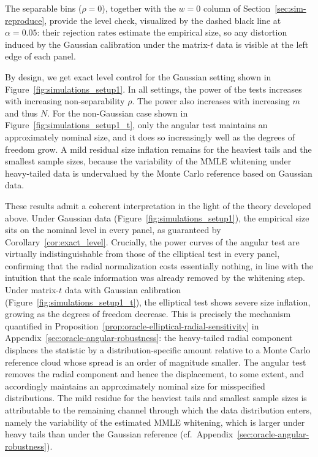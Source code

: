 \documentclass[12pt]{article}
\begin{document}
The separable bins ($\rho=0$), together with the $w=0$ column of Section~\ref{sec:sim-reproduce}, provide the level check, visualized by the dashed black line at $\alpha = 0.05$: their rejection rates estimate the empirical size, so any distortion induced by the Gaussian calibration under the matrix-$t$ data is visible at the left edge of each panel.

By design, we get exact level control for the Gaussian setting shown in Figure~\ref{fig:simulations_setup1}. In all settings, the power of the tests increases with increasing non-separability $\rho$. 
The power also increases with increasing $m$ and thus $N$. For the non-Gaussian case shown in Figure~\ref{fig:simulations_setup1_t}, only the angular test maintains an approximately nominal size, and it does so increasingly well as the degrees of freedom grow. A mild residual size inflation remains for the heaviest tails and the smallest sample sizes, because the variability of the MMLE whitening under heavy-tailed data is undervalued by the Monte Carlo reference based on Gaussian data.

These results admit a coherent interpretation in the light of the theory developed above. Under Gaussian data (Figure~\ref{fig:simulations_setup1}), the empirical size sits on the nominal level in every panel, as guaranteed by Corollary~\ref{cor:exact_level}. Crucially, the power curves of the angular test are virtually indistinguishable from those of the elliptical test in every panel, confirming that the radial normalization costs essentially nothing, in line with the intuition that the scale information was already removed by the whitening step. Under matrix-$t$ data with Gaussian calibration (Figure~\ref{fig:simulations_setup1_t}), the elliptical test shows severe size inflation, growing as the degrees of freedom decrease. This is precisely the mechanism quantified in Proposition~\ref{prop:oracle-elliptical-radial-sensitivity} in Appendix~\ref{sec:oracle-angular-robustness}: the heavy-tailed radial component displaces the statistic by a distribution-specific amount relative to a Monte Carlo reference cloud whose spread is an order of magnitude smaller. The angular test removes the radial component and hence the displacement, to some extent, and accordingly maintains an approximately nominal size for misspecified distributions. The mild residue for the heaviest tails and smallest sample sizes is attributable to the remaining channel through which the data distribution enters, namely the variability of the estimated MMLE whitening, which is larger under heavy tails than under the Gaussian reference (cf.~Appendix~\ref{sec:oracle-angular-robustness}).
\end{document}
